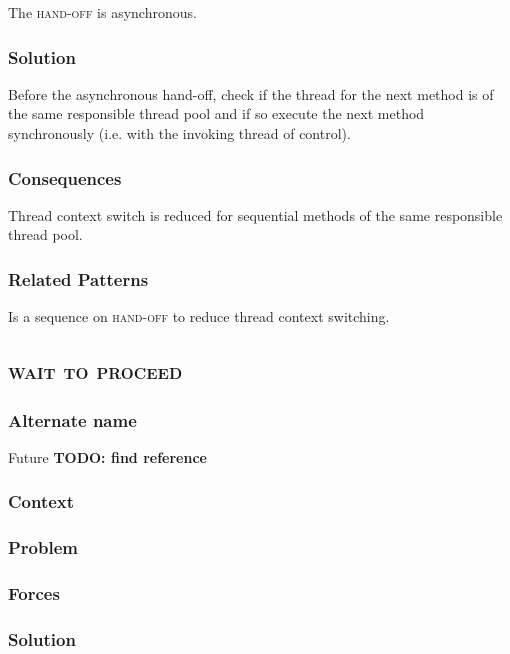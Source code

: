 \documentclass[prodmode]{style/acmlarge}
\begin{document}
The \textsc{hand-off} is asynchronous.

\subsubsection*{Solution}

Before the asynchronous hand-off, check if the thread for the next method is of
the same responsible thread pool and if so execute the next method
synchronously (i.e. with the invoking thread of control).

\subsubsection*{Consequences}

Thread context switch is reduced for sequential methods of the same responsible
thread pool.

\subsubsection*{Related Patterns}

Is a sequence on \textsc{hand-off} to reduce thread context switching.


\subsection{\textsc{\textbf{wait to proceed}}}

\subsubsection*{Alternate name}

Future \textbf{TODO: find reference}

\subsubsection*{Context}

\subsubsection*{Problem}

\subsubsection*{Forces}

\subsubsection*{Solution}
\end{document}
